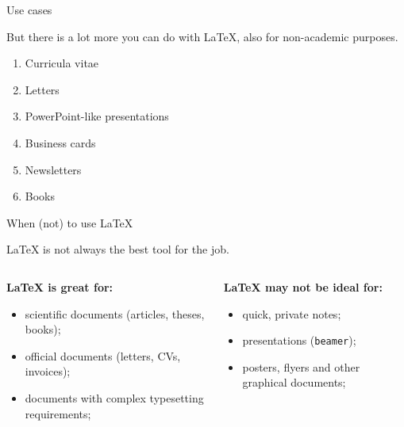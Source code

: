 \documentclass{beamer}
\newcommand{\code}[1]{\texttt{#1}}
\begin{document}
\begin{frame}{Use cases}

    But there is a lot more you can do with \LaTeX{}, also for non-academic purposes.

    \medskip

    \begin{enumerate}
        \item<2-> Curricula vitae
        \item<3-> Letters
        \item<4-> PowerPoint-like presentations
        \item<5-> Business cards
        \item<6-> Newsletters
        \item<7-> Books
    \end{enumerate}
\end{frame}

\begin{frame}{When (not) to use \LaTeX}

    \LaTeX{} is not always the best tool for the job.

    \bigskip

    \begin{columns}[t]
        \begin{column}{0.5\textwidth}
            \textbf{\LaTeX{} is great for:}
            \begin{itemize}
                \item<2-> scientific documents (articles, theses, books);
                \item<2-> official documents (letters, CVs, invoices);
                \item<2-> documents with complex typesetting requirements;
            \end{itemize}
        \end{column}
        \begin{column}{0.5\textwidth}
            \textbf{\LaTeX{} may not be ideal for:}
            \begin{itemize}
                \item<3-> quick, private notes;
                \item<3-> presentations (\code{beamer});
                \item<3-> posters, flyers and other graphical documents;
            \end{itemize}
        \end{column}
    \end{columns}
\end{frame}
\end{document}
